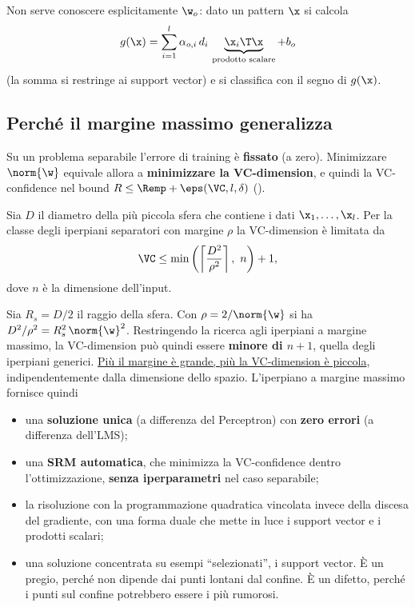 Non serve conoscere esplicitamente $\w_o$: dato un pattern $\x$ si calcola
\[
g(\x) = \sum_{i=1}^{l}\alpha_{o,i}\,d_i\,\underbrace{\x_i\T\x}_{\text{prodotto scalare}} + b_o
\]
(la somma si restringe ai support vector) e si classifica con il segno di $g(\x)$.

\subsection{Perché il margine massimo generalizza}
\label{sec:svm-srm}

Su un problema separabile l'errore di training è \textbf{fissato} (a zero). Minimizzare $\norm{\w}$ equivale allora
a \textbf{minimizzare la VC-dimension}, e quindi la VC-confidence nel bound $R\le\Remp+\eps(\VC,l,\delta)$
().

\begin{teorema}[Vapnik]
Sia $D$ il diametro della più piccola sfera che contiene i dati $\x_1,\dots,\x_l$. Per la classe degli iperpiani
separatori con margine $\rho$ la VC-dimension è limitata da
\[
\VC \le \min\left(\left\lceil\frac{D^2}{\rho^2}\right\rceil,\ n\right) + 1 ,
\]
dove $n$ è la dimensione dell'input.
\end{teorema}

Sia $R_s = D/2$ il raggio della sfera. Con $\rho = 2/\norm{\w}$ si ha $D^2/\rho^2 = R_s^2\,\norm{\w}^2$. Restringendo
la ricerca agli iperpiani a margine massimo, la VC-dimension può quindi essere \textbf{minore di $n+1$}, quella
degli iperpiani generici. \uline{Più il margine è grande, più la VC-dimension è piccola}, indipendentemente dalla
dimensione dello spazio. L'iperpiano a margine massimo fornisce quindi
\begin{itemize}
  \item una \textbf{soluzione unica} (a differenza del Perceptron) con \textbf{zero errori} (a differenza dell'LMS);
  \item una \textbf{SRM automatica}, che minimizza la VC-confidence dentro l'ottimizzazione, \textbf{senza
        iperparametri} nel caso separabile;
  \item la risoluzione con la programmazione quadratica vincolata invece della discesa del gradiente, con una forma
        duale che mette in luce i support vector e i prodotti scalari;
  \item una soluzione concentrata su esempi ``selezionati'', i support vector. È un pregio, perché non dipende dai
        punti lontani dal confine. È un difetto, perché i punti sul confine potrebbero essere i più rumorosi.
\end{itemize}

